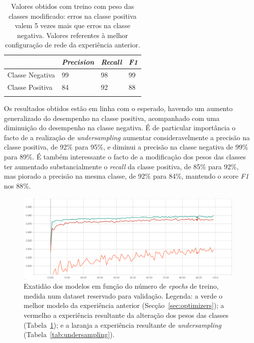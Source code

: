 \documentclass[]{article}
\begin{document}
\begin{table}[h!]
\centering
  \begin{tabular}{llll}
  \hline
   				  & \textit{Precision} & \textit{Recall} & \textit{F1} \\ \hline
  Classe Negativa & 99			   & 98			 & 99   \\
  Classe Positiva & 84			   & 92			 & 88    \\ \hline \\
\end{tabular}
  \caption{Valores obtidos com treino com peso das classes modificado: erros na classe positiva valem 5 vezes mais que erros na classe negativa. Valores referentes à melhor configuração de rede da experiência anterior.}
  \label{tab:class_weights}
\end{table}

Os resultados obtidos estão em linha com o esperado, havendo um aumento generalizado do desempenho na classe positiva, acompanhado com uma diminuição do desempenho na classe negativa. É de particular importância o facto de a realização de \textit{undersampling} aumentar consideravelmente a precisão na classe positiva, de 92\% para 95\%, e diminui a precisão na classe negativa de 99\% para 89\%. É também interessante o facto de a modificação dos pesos das classes ter aumentado substancialmente o \textit{recall} da classe positiva, de 85\% para 92\%, mas piorado a precisão na mesma classe, de 92\% para 84\%, mantendo o score \textit{F1} nos 88\%.

\begin{figure}[h!]
\centering
\includegraphics[scale=0.35]{img/acc_undersampling_class_weights.png}
\caption{Exatidão dos modelos em função do número de \textit{epochs} de treino, medida num dataset reservado para validação. Legenda: a verde o melhor modelo da experiência anterior (Secção~\ref{sec:optimizers}); a vermelho a experiência resultante da alteração dos pesos das classes (Tabela~\ref{tab:class_weights}); e a laranja a experiência resultante de \textit{undersampling} (Tabela~\ref{tab:undersampling}).}
\label{fig:acc_undersampling_class_weights}
\end{figure}
\end{document}
